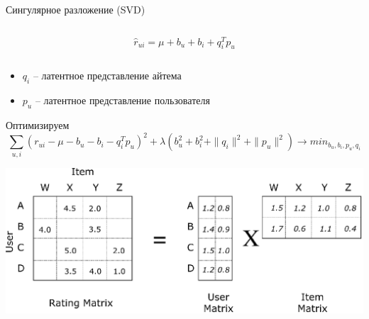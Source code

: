 \documentclass[11pt,aspectratio=169,handout]{beamer}
\begin{document}
\begin{frame}{Сингулярное разложение (SVD)}

\begin{columns}
\begin{column}{0.2\textwidth} 
\end{column}
\begin{column}{0.5\textwidth} 
\begin{tcolorbox}[colback=info!5,colframe=info!80,title=Модель]
\[
\hat r_{ui} = \mu + b_u + b_i + q_i^T p_u
\]
\end{tcolorbox}
\end{column}
\begin{column}{0.2\textwidth} 
\end{column}
\end{columns}

\vfill

\begin{itemize}
\item $q_i$ -- латентное представление айтема
\item $p_u$ -- латентное представление пользователя
\end{itemize}

\vfill

Оптимизируем
\[
\sum_{u, i} (r_{ui} - \mu - b_u - b_i - q_i^T p_u)^2 + \lambda (b_u^2 +  b_i^2 + \| q_i \|^2 + \| p_u \|^2) \rightarrow min_{b_u, b_i, p_u, q_i}
\]

\end{frame}

\begin{frame}
\begin{center}
\includegraphics[scale=0.5]{images/SVD.png}
\end{center}
\end{frame}
\end{document}
